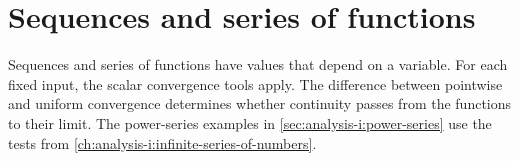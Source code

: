 \chapter{Sequences and series of functions}
\label{ch:analysis-i:sequences-and-series-of-functions}

Sequences and series of functions have values that depend on a variable.
For each fixed input, the scalar convergence tools apply.
The difference between pointwise and uniform convergence
determines whether continuity passes from the functions to their limit.
The power-series examples in \autoref{sec:analysis-i:power-series}
use the tests from \autoref{ch:analysis-i:infinite-series-of-numbers}.







